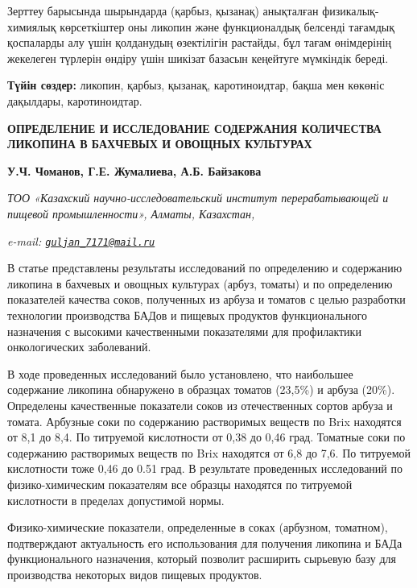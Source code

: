 Зерттеу барысында шырындарда (қарбыз, қызанақ) анықталған
физикалық-химиялық көрсеткіштер оны ликопин және функционалдық белсенді
тағамдық қоспаларды алу үшін қолданудың өзектілігін растайды, бұл тағам
өнімдерінің жекелеген түрлерін өндіру үшін шикізат базасын кеңейтуге
мүмкіндік береді.

{\bfseries Түйін сөздер:} ликопин, қарбыз, қызанақ, каротиноидтар, бақша
мен көкөніс дақылдары, каротиноидтар.

\begin{articleheader}
{\bfseries ОПРЕДЕЛЕНИЕ И ИССЛЕДОВАНИЕ СОДЕРЖАНИЯ КОЛИЧЕСТВА ЛИКОПИНА В БАХЧЕВЫХ И ОВОЩНЫХ КУЛЬТУРАХ}

{\bfseries
У.Ч. Чоманов,
Г.Е. Жумалиева\textsuperscript{\envelope },
А.Б. Байзакова}
\end{articleheader}

\begin{affiliation}
\emph{ТОО «Казахский научно-исследовательский институт перерабатывающей и пищевой промышленности», Алматы, Казахстан,}

\emph{e-mail: \href{mailto:guljan_7171@mail.ru}{\nolinkurl{guljan\_7171@mail.ru}}}
\end{affiliation}

В статье представлены результаты исследований по определению и
содержанию ликопина в бахчевых и овощных культурах (арбуз, томаты) и по
определению показателей качества соков, полученных из арбуза и томатов с
целью разработки технологии производства БАДов и пищевых продуктов
функционального назначения с высокими качественными показателями для
профилактики онкологических заболеваний.

В ходе проведенных исследований было установлено, что наибольшее
содержание ликопина обнаружено в образцах томатов (23,5\%) и арбуза
(20\%). Определены качественные показатели соков из отечественных сортов
арбуза и томата. Арбузные соки по содержанию растворимых веществ по Brix
находятся от 8,1 до 8,4. По титруемой кислотности от 0,38 до 0,46 град.
Томатные соки по содержанию растворимых веществ по Brix находятся от 6,8
до 7,6. По титруемой кислотности тоже 0,46 до 0.51 град. В результате
проведенных исследований по физико-химическим показателям все образцы
находятся по титруемой кислотности в пределах допустимой нормы.

Физико-химические показатели, определенные в соках (арбузном, томатном),
подтверждают актуальность его использования для получения ликопина и
БАДа функционального назначения, который позволит расширить сырьевую
базу для производства некоторых видов пищевых продуктов.

